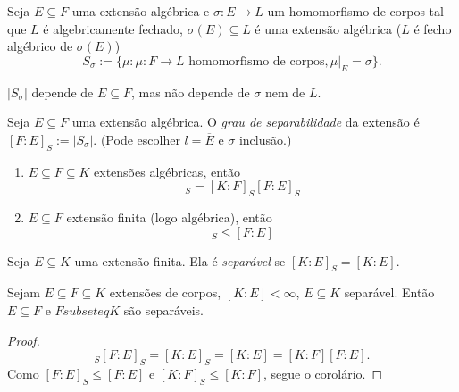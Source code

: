 \begin{definition}
	Seja $E \subseteq F$ uma extensão algébrica e $\sigma:E \to L$ um homomorfismo de corpos tal que $L$ é algebricamente fechado, $\sigma(E) \subseteq L$ é uma extensão algébrica ($L$ é fecho algébrico de $\sigma(E)$)
	\begin{equation*}
	S_\sigma := \{\mu : \mu: F \to L \text{\ homomorfismo de corpos}, \mu|_E=\sigma\}.
	\end{equation*}
\end{definition}

\begin{lemma}
	$|S_\sigma|$ depende de $E \subseteq F$, mas não depende de $\sigma$ nem de $L$.
\end{lemma}

\begin{definition}
	Seja $E \subseteq F$ uma extensão algébrica. O \emph{grau de separabilidade} da extensão é $[F:E]_S := |S_\sigma|$. (Pode escolher $l=\overline{E}$ e $\sigma$ inclusão.)
\end{definition}

\begin{theorem}
	\begin{enumerate}
	\item $E \subseteq F \subseteq K$ extensões algébricas, então
		\begin{equation*}
		[K:E]_S = [K:F]_S[F:E]_S
		\end{equation*}
	\item $E \subseteq F$ extensão finita (logo algébrica), então
		\begin{equation*}
		[F:E]_S \leq [F:E]
		\end{equation*}
	\end{enumerate}
\end{theorem}

\begin{definition}
	Seja $E \subseteq K$ uma extensão finita. Ela é \emph{separável} se $[K:E]_S=[K:E]$.
\end{definition}

\begin{corollary}
	Sejam $E \subseteq F \subseteq K$ extensões de corpos, $[K:E] < \infty$, $E \subseteq K$ separável. Então $E \subseteq F$ e $F subseteq K$ são separáveis.
\end{corollary}
\begin{proof}
	\begin{equation*}
	[K:F]_S [F:E]_S = [K:E]_S = [K:E] = [K:F][F:E].
	\end{equation*}
	Como $[F:E]_S \leq [F:E]$ e $[K:F]_S \leq [K:F]$, segue o corolário.
\end{proof}



